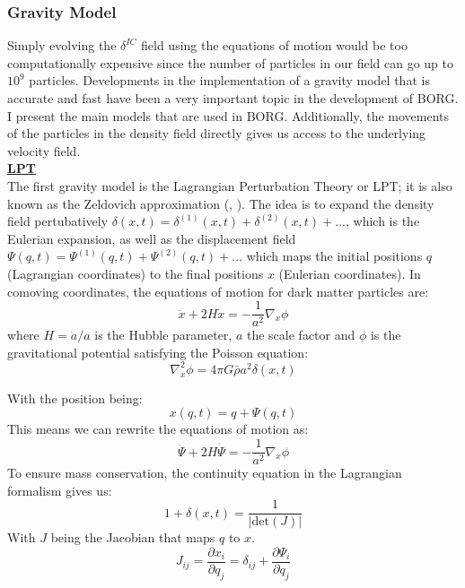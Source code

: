 \subsubsection{Gravity Model} \label{sec:gravity_model}
Simply evolving the $\delta^{IC}$ field using the equations of motion would be too computationally expensive since the number of particles in our field can go up to $10^9$ 
particles. Developments in the implementation of a gravity model that is accurate and fast have been a very important topic in the development of BORG. I present the 
main models that are used in BORG. Additionally, the movements of the particles in the density field directly gives us access to the underlying velocity field. \\

\noindent \textbf{\underline{LPT}} \\

The first gravity model is the Lagrangian Perturbation Theory or LPT; it is also known as the Zeldovich approximation (\cite{zeldovich_1970}, \cite{Crocce_2006}). 
The idea is to expand the density field pertubatively $\delta(x, t) = \delta^{(1)}(x, t) + \delta^{(2)}(x, t) + ... $, which is the Eulerian expansion, as well 
as the displacement field $\Psi(q, t)= \Psi^{(1)}(q, t) + \Psi^{(2)}(q, t) + ...$ which maps the initial positions $q$ (Lagrangian coordinates) to the final positions $x$ (Eulerian coordinates). 
In comoving coordinates, the equations of motion for dark matter particles are: 
\begin{equation}
    \ddot{x} + 2H\dot{x} = -\frac{1}{a^2} \nabla_x \phi
\end{equation}
where $H = \dot{a}/a$ is the Hubble parameter, $a$ the scale factor and $\phi$ is the gravitational potential satisfying the Poisson equation: 
\begin{equation}
    \nabla^2_x \phi = 4\pi G \bar{\rho} a^2 \delta(x,t)
\end{equation}

With the position being: 
\begin{equation}
    x(q,t) = q + \Psi(q,t)
    \label{eqn:eqn_of_motion_general}
\end{equation}
This means we can rewrite the equations of motion as: 
\begin{equation}
     \ddot{\Psi} + 2H \dot{\Psi} = -\frac{1}{a^2} \nabla_x \phi
\end{equation}
To ensure mass conservation, the continuity equation in the Lagrangian formalism gives us:  
\begin{equation}
    1+\delta(x, t) = \frac{1}{|\text{det}(J)|}
\end{equation} 
With $J$ being the Jacobian that maps $q$ to $x$. 
\begin{equation}
    J_{ij} = \frac{\partial x_i}{\partial q_j} = \delta_{ij} + \frac{\partial \Psi_i}{\partial q_j}
\end{equation}

